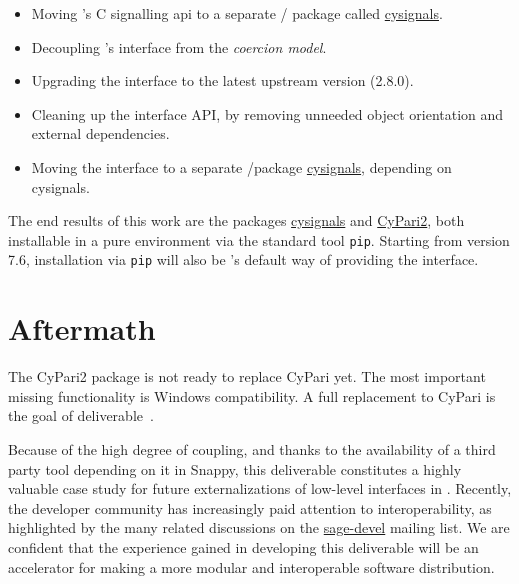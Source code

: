 \documentclass{deliverablereport}
\begin{document}
\begin{itemize}
\tightlist
\item Moving \Sage's C signalling api to a separate \Python/\Cython
  package called
  \href{https://github.com/sagemath/cysignals}{cysignals}.
\item Decoupling \Sage's \Pari interface from the \emph{coercion
    model}.
\item Upgrading the \Pari interface to the latest upstream version
  (2.8.0).
\item Cleaning up the \Pari interface API, by removing unneeded object
  orientation and external dependencies.
\item Moving the \Pari interface to a separate \Python/\Cython package
  \href{https://github.com/sagemath/cysignals}{cysignals}, depending
  on cysignals.
\end{itemize}

The end results of this work are the packages
\href{https://github.com/sagemath/cysignals}{cysignals} and
\href{https://github.com/sagemath/cypari2}{CyPari2}, both installable
in a pure \Python environment via the standard tool
\texttt{pip}. Starting from version 7.6, installation via \texttt{pip}
will also be \Sage's default way of providing the \Pari interface.


\section{Aftermath}

The CyPari2 package is not ready to replace CyPari yet. The most
important missing functionality is Windows compatibility. A full
replacement to CyPari is the goal of
deliverable~.

Because of the high degree of coupling, and thanks to the availability
of a third party tool depending on it in Snappy, this deliverable
constitutes a highly valuable case study for future externalizations
of low-level interfaces in \Sage. Recently, the \Sage developer
community has increasingly paid attention to interoperability, as
highlighted by the many related discussions on the
\href{https://groups.google.com/forum/#!forum/sage-devel}{sage-devel}
mailing list.  We are confident that the experience gained in
developing this deliverable will be an accelerator for making \Sage a
more modular and interoperable software distribution.



\end{document}
